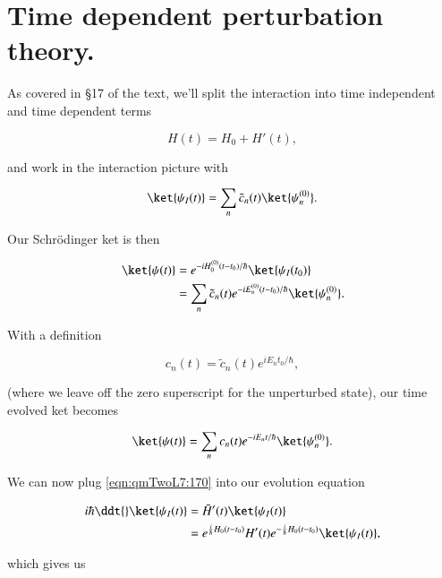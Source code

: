 \section{Time dependent perturbation theory.}

As covered in \S 17 of the text, we'll split the interaction into time independent and time dependent terms

\begin{equation}\label{eqn:qmTwoL7:150}
H(t) = H_0 + H'(t),
\end{equation}

and work in the interaction picture with

\begin{equation}\label{eqn:qmTwoL7:170}
\ket{\psi_I(t)} = \sum_n \tilde{c}_n(t) \ket{\psi_n^{(0)} }.
\end{equation}

Our Schr\"{o}dinger ket is then

\begin{equation}\label{eqn:qmTwoL7:190}
\begin{aligned}
\ket{\psi(t)}
&=
e^{-i H_0^{(0)}(t- t_0)/\hbar}
\ket{\psi_I(t_0) } \\
&=
\sum_n \tilde{c}_n(t)
e^{-i E_n^{(0)}(t- t_0)/\hbar}
\ket{\psi_n^{(0)} }.
\end{aligned}
\end{equation}

With a definition

\begin{equation}\label{eqn:qmTwoL7:210}
c_n(t) = \tilde{c}_n(t) e^{i E_n t_0/\hbar},
\end{equation}

(where we leave off the zero superscript for the unperturbed state), our time evolved ket becomes

\begin{equation}\label{eqn:qmTwoL7:230}
\ket{\psi(t)}
=
\sum_n c_n(t)
e^{-i E_n t/\hbar}
\ket{\psi_n^{(0)} }.
\end{equation}

We can now plug \ref{eqn:qmTwoL7:170} into our evolution equation

\begin{align*}
i\hbar \ddt{} \ket{\psi_I(t)}
&=
\bar{H}'(t) \ket{\psi_I(t)} \\
&=
e^{\frac{i}{\hbar} H_0(t - t_0)} H'(t) e^{-\frac{i}{\hbar} H_0(t - t_0)}
\ket{\psi_I(t)},
\end{align*}

which gives us

